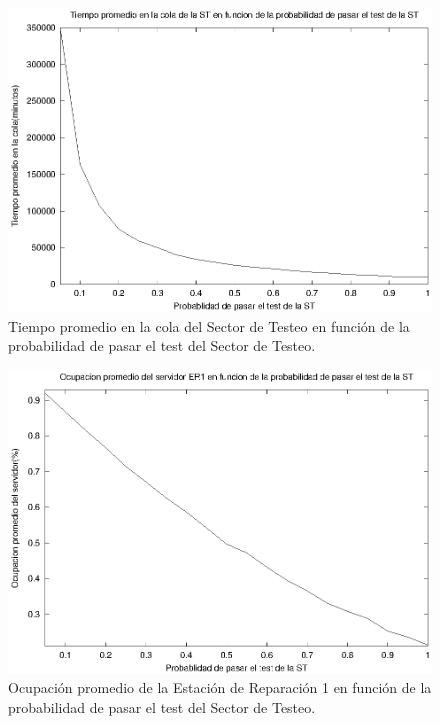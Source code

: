 \documentclass[a4paper,10pt]{article}
\begin{document}
\begin{figure}[ht]
\begin{center}
\includegraphics[width=15cm]{./img/tp_ST.eps}
\caption{\label{fig:tp_ST} Tiempo promedio en la cola del Sector de Testeo en funci\'on de la probabilidad de pasar el test del Sector de Testeo.}
\end{center}
\end{figure}

\begin{figure}[ht]
\begin{center}
\includegraphics[width=15cm]{./img/ss_ER1.eps}
\caption{\label{fig:ss_ER1} Ocupaci\'on promedio de la Estaci\'on de Reparaci\'on 1 en funci\'on de la probabilidad de pasar el test del Sector de Testeo.}
\end{center}
\end{figure}
\end{document}
